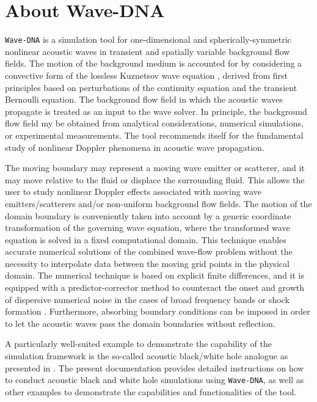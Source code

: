 \chapter{About Wave-DNA}
\label{chap:About Wave-DNA}

{\tt Wave-DNA} is a simulation tool for one-dimensional and spherically-symmetric nonlinear acoustic waves in transient and spatially variable background flow fields. The motion of the background medium is accounted for by considering a convective form of the lossless Kuznetsov wave equation \citep{Schenke_et_al_2023_JASA}, derived from first principles based on perturbations of the continuity equation and the transient Bernoulli equation. The background flow field in which the acoustic waves propagate is treated as an input to the wave solver. In principle, the background flow field my be obtained from analytical considerations, numerical simulations, or experimental measurements. The tool recommends itself for the fundamental study of nonlinear Doppler phenomena in acoustic wave propagation.

The moving boundary may represent a moving wave emitter or scatterer, and it may move relative to the fluid or displace the surrounding fluid. This allows the user to study nonlinear Doppler effects associated with moving wave emitters/scatterers and/or non-uniform background flow fields. The motion of the domain boundary is conveniently taken into account by a generic coordinate transformation of the governing wave equation, where the transformed wave equation is solved in a fixed computational domain. This technique enables accurate numerical solutions of the combined wave-flow problem without the necessity to interpolate data between the moving grid points in the physical domain. The numerical technique is based on explicit finite differences, and it is equipped with a predictor-corrector method to counteract the onset and growth of dispersive numerical noise in the cases of broad frequency bands or shock formation \citep{Schenke_et_al_2022}. Furthermore, absorbing boundary conditions can be imposed in order to let the acoustic waves pass the domain boundaries without reflection.

A particularly well-suited example to demonstrate the capability of the simulation framework is the so-called acoustic black/white hole analogue as presented in \citep{Schenke_et_al_2022_PoF, Schenke_et_al_2023_JASA}. The present documentation provides detailed instructions on how to conduct acoustic black and white hole simulations using {\tt Wave-DNA}, as well as other examples to demonstrate the capabilities and functionalities of the tool.

